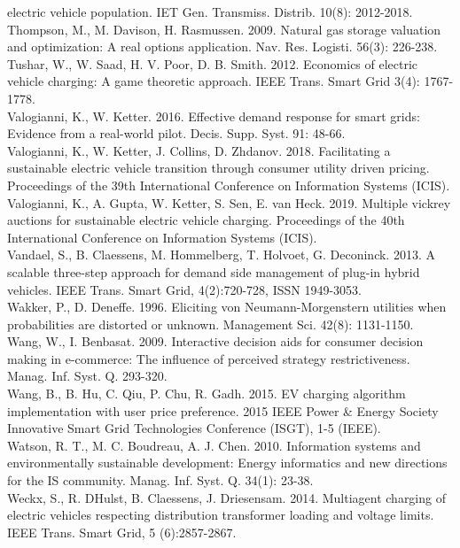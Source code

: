 \documentclass[10pt]{article}
\begin{document}
electric vehicle population. IET Gen. Transmiss. Distrib. 10(8): 2012-2018.\\
Thompson, M., M. Davison, H. Rasmussen. 2009. Natural gas storage valuation and optimization: A real options application. Nav. Res. Logisti. 56(3): 226-238.\\
Tushar, W., W. Saad, H. V. Poor, D. B. Smith. 2012. Economics of electric vehicle charging: A game theoretic approach. IEEE Trans. Smart Grid 3(4): 1767-1778.\\
Valogianni, K., W. Ketter. 2016. Effective demand response for smart grids: Evidence from a real-world pilot. Decis. Supp. Syst. 91: 48-66.\\
Valogianni, K., W. Ketter, J. Collins, D. Zhdanov. 2018. Facilitating a sustainable electric vehicle transition through consumer utility driven pricing. Proceedings of the 39th International Conference on Information Systems (ICIS).\\
Valogianni, K., A. Gupta, W. Ketter, S. Sen, E. van Heck. 2019. Multiple vickrey auctions for sustainable electric vehicle charging. Proceedings of the 40th International Conference on Information Systems (ICIS).\\
Vandael, S., B. Claessens, M. Hommelberg, T. Holvoet, G. Deconinck. 2013. A scalable three-step approach for demand side management of plug-in hybrid vehicles. IEEE Trans. Smart Grid, 4(2):720-728, ISSN 1949-3053.\\
Wakker, P., D. Deneffe. 1996. Eliciting von Neumann-Morgenstern utilities when probabilities are distorted or unknown. Management Sci. 42(8): 1131-1150.\\
Wang, W., I. Benbasat. 2009. Interactive decision aids for consumer decision making in e-commerce: The influence of perceived strategy restrictiveness. Manag. Inf. Syst. Q. 293-320.\\
Wang, B., B. Hu, C. Qiu, P. Chu, R. Gadh. 2015. EV charging algorithm implementation with user price preference. 2015 IEEE Power \& Energy Society Innovative Smart Grid Technologies Conference (ISGT), 1-5 (IEEE).\\
Watson, R. T., M. C. Boudreau, A. J. Chen. 2010. Information systems and environmentally sustainable development: Energy informatics and new directions for the IS community. Manag. Inf. Syst. Q. 34(1): 23-38.\\
Weckx, S., R. DHulst, B. Claessens, J. Driesensam. 2014. Multiagent charging of electric vehicles respecting distribution transformer loading and voltage limits. IEEE Trans. Smart Grid, 5 (6):2857-2867.
\end{document}

